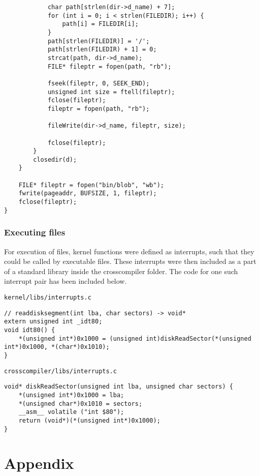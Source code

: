 \documentclass{article}
\begin{document}
\begin{verbatim}
			char path[strlen(dir->d_name) + 7];
			for (int i = 0; i < strlen(FILEDIR); i++) {
				path[i] = FILEDIR[i];
			}
			path[strlen(FILEDIR)] = '/';
			path[strlen(FILEDIR) + 1] = 0;
			strcat(path, dir->d_name);
			FILE* fileptr = fopen(path, "rb");

			fseek(fileptr, 0, SEEK_END);
			unsigned int size = ftell(fileptr);
			fclose(fileptr);
			fileptr = fopen(path, "rb");

			fileWrite(dir->d_name, fileptr, size);

			fclose(fileptr);
		}
		closedir(d);
	}

	FILE* fileptr = fopen("bin/blob", "wb");
	fwrite(pageaddr, BUFSIZE, 1, fileptr);
	fclose(fileptr);
}
\end{verbatim}

\subsubsection{Executing files}

For execution of files, kernel functions were defined as interrupts,
such that they could be called by executable files. These interrupts
were then included as a part of a standard library inside the crosscompiler
folder. The code for one such interrupt pair has been included below.

\begin{verbatim}
kernel/libs/interrupts.c
\end{verbatim}
\begin{verbatim}
// readdisksegment(int lba, char sectors) -> void*
extern unsigned int _idt80;
void idt80() {
	*(unsigned int*)0x1000 = (unsigned int)diskReadSector(*(unsigned int*)0x1000, *(char*)0x1010);
}
\end{verbatim}

\begin{verbatim}
crosscompiler/libs/interrupts.c
\end{verbatim}
\begin{verbatim}
void* diskReadSector(unsigned int lba, unsigned char sectors) {
	*(unsigned int*)0x1000 = lba;
	*(unsigned char*)0x1010 = sectors;
	__asm__ volatile ("int $80");
	return (void*)(*(unsigned int*)0x1000);
}
\end{verbatim}

\newpage

\section{Appendix}
\appendix
\end{document}
